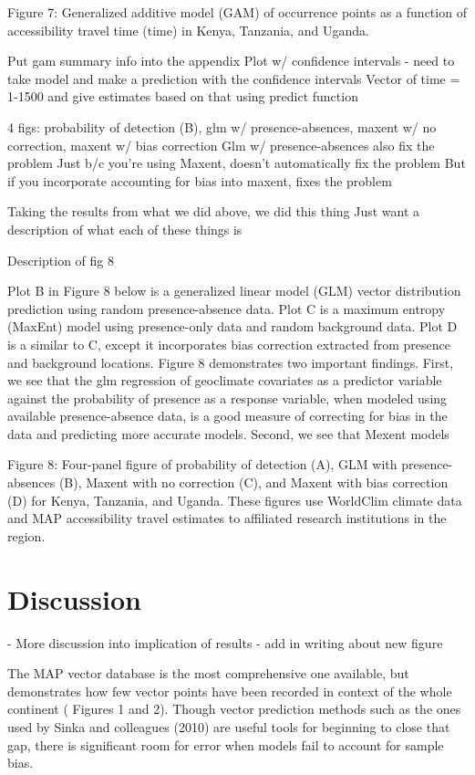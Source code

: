 \documentclass[sn-nature]{sn-jnl}%
\begin{document}
Figure 7: Generalized additive model (GAM) of occurrence points as a function of accessibility travel time (time) in Kenya, Tanzania, and Uganda.

Put gam summary info into the appendix
Plot w/ confidence intervals - need to take model and make a prediction with the confidence intervals
Vector of time = 1-1500 and give estimates based on that using predict function

4 figs: probability of detection (B), glm w/ presence-absences, maxent w/ no correction, maxent w/ bias correction 
Glm w/ presence-absences also fix the problem
Just b/c you’re using Maxent, doesn’t automatically fix the problem
But if you incorporate accounting for bias into maxent, fixes the problem

Taking the results from what we did above, we did this thing
Just want a description of what each of these things is

Description of fig 8

Plot B in Figure 8 below is a generalized linear model (GLM) vector distribution prediction using random presence-absence data. Plot C is a maximum entropy (MaxEnt) model using presence-only data and random background data. Plot D is a similar to C, except it incorporates bias correction extracted from presence and background locations. Figure 8 demonstrates two important findings. First, we see that the glm regression of geoclimate covariates as a predictor variable against the probability of presence as a response variable, when modeled using available presence-absence data, is a good measure of correcting for bias in the data and predicting more accurate models. Second, we see that Mexent models 



Figure 8: Four-panel figure of probability of detection (A), GLM with presence-absences (B), Maxent with no correction (C), and Maxent with bias correction (D) for Kenya, Tanzania, and Uganda. These figures use WorldClim climate data and MAP accessibility travel estimates to affiliated research institutions in the region. 


\section*{Discussion}\label{discussion}
- More discussion into implication of results 
- add in writing about new figure

The MAP vector database is the most comprehensive one available, but demonstrates how few vector points have been recorded in context of the whole continent ( Figures 1 and 2). Though vector prediction methods such as the ones used by Sinka and colleagues (2010) are useful tools for beginning to close that gap, there is significant room for error when models fail to account for sample bias.
\end{document}

